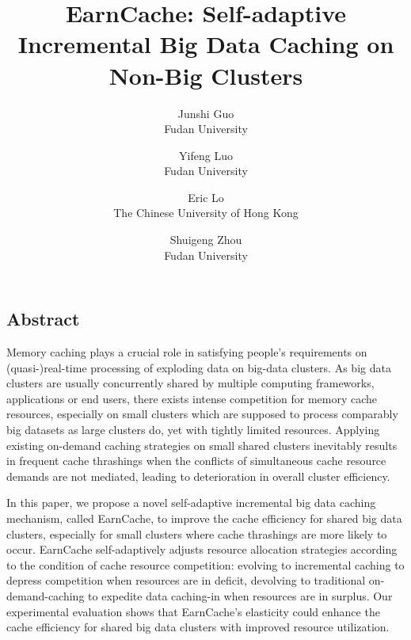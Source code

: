 \documentclass[letterpaper,twocolumn,10pt]{article}
\begin{document}
\date{}

\title{\Large \bf EarnCache: Self-adaptive Incremental Big Data Caching on Non-Big Clusters}

\author{
{\rm Junshi Guo}\\
Fudan University
\and
{\rm Yifeng Luo}\\
Fudan University
\and
{\rm Eric Lo}\\
The Chinese University of Hong Kong
\and
{\rm Shuigeng Zhou}\\
Fudan University
} %

\maketitle

\thispagestyle{empty}


\subsection*{Abstract}
Memory caching plays a crucial role in satisfying people's requirements on (quasi-)real-time processing of exploding data on big-data clusters. As big data clusters are usually concurrently shared by multiple computing frameworks, applications or end users, there exists intense competition for memory cache resources, especially on small clusters which are supposed to process comparably big datasets as large clusters do, yet with tightly limited resources. Applying existing on-demand caching strategies on small shared clusters inevitably results in frequent cache thrashings when the conflicts of simultaneous cache resource demands are not mediated, leading to deterioration in overall cluster efficiency.

In this paper, we propose a novel self-adaptive incremental big data caching mechanism, called EarnCache, to improve the cache efficiency for shared big data clusters, especially for small clusters where cache thrashings are more likely to occur. EarnCache self-adaptively adjusts resource allocation strategies according to the condition of cache resource competition: evolving to incremental caching to depress competition when resources are in deficit, devolving to traditional on-demand-caching to expedite data caching-in when resources are in surplus. Our experimental evaluation shows that EarnCache's elasticity could enhance the cache efficiency for shared big data clusters with improved resource utilization.
\end{document}

